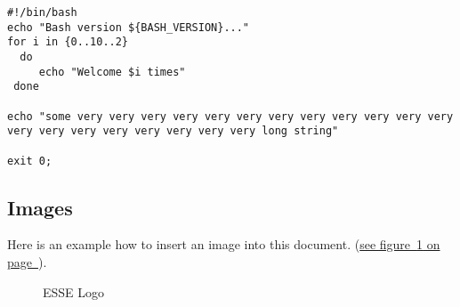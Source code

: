 \documentclass[12pt,a4paper,titlepage,oneside]{scrartcl}
\begin{document}
\begin{lstlisting}[caption=Example bash script,label=code:example2,style=simple]
#!/bin/bash
echo "Bash version ${BASH_VERSION}..."
for i in {0..10..2}
  do
     echo "Welcome $i times"
 done

echo "some very very very very very very very very very very very very very very very very very very very very long string"

exit 0;
\end{lstlisting}

\subsection{Images}

Here is an example how to insert an image into this document.
(\hyperref[fig:logo1]{see figure~\ref*{fig:logo1} on page~\pageref*{fig:logo1}}).

\begin{figure}[h!]
  \centering
  \caption{ESSE Logo}
  \label{fig:logo1}
\end{figure}


%
%
\end{document}
